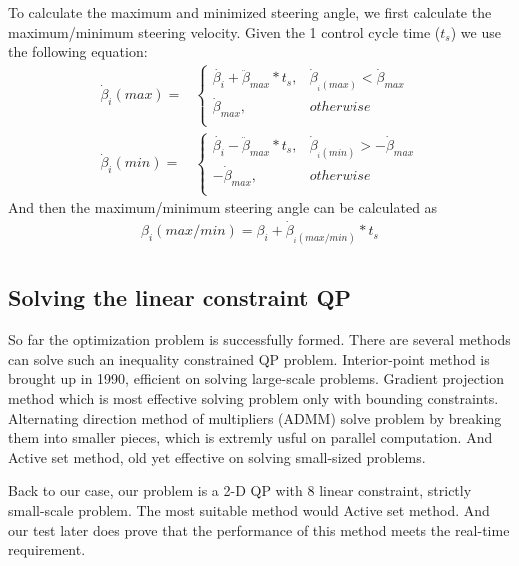 To calculate the maximum and minimized steering angle, we first calculate the maximum/minimum steering velocity. Given the 1 control cycle time ($t_s$) we use the following equation:
\begin{equation}\label{eq:betaDotMax}
	\begin{split}
		\dot{\beta}_i(max)=&
		\begin{cases}
		\dot{\beta_i}+\ddot{\beta}_{max}*t_s, &\dot{\beta}_{_i(max)}<\dot{\beta}_{max}\\
		\dot{\beta}_{max}, &otherwise\\
		\end{cases}\\
		\dot{\beta}_i(min)=&
		\begin{cases}
		\dot{\beta_i}-\ddot{\beta}_{max}*t_s, &\dot{\beta}_{_i(min)}>-\dot{\beta}_{max}\\
		-\dot{\beta}_{max}, &otherwise\\
		\end{cases}
	\end{split}
\end{equation}
And then the maximum/minimum steering angle can be calculated as 
\begin{equation}\label{eq:betaMax}
	\begin{split}
		\beta_i(max/min)= \beta_i + \dot{\beta}_{_i(max/min)}*t_s\\
	\end{split}
\end{equation}
\subsection{Solving the linear constraint QP}\label{subsec:solveQP}
So far the optimization problem is successfully formed. There are several methods can solve such an inequality constrained QP problem. Interior-point method is brought up in 1990, efficient on solving large-scale problems. Gradient projection method which is most effective solving problem only with bounding constraints. Alternating direction method of multipliers (ADMM) solve problem by breaking them into smaller pieces, which is extremly usful on parallel computation. And Active set method, old yet effective on solving small-sized problems.

Back to our case, our problem is a 2-D QP with 8 linear constraint, strictly small-scale problem. The most suitable method would Active set method. And our test later does prove that the performance of this method meets the real-time requirement.

